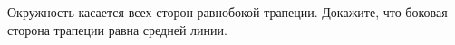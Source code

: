 \begin{ex}
	\begin{condition}
		Окружность касается всех сторон равнобокой трапеции. Докажите, что боковая сторона трапеции равна средней линии.
	\end{condition}
\end{ex}
